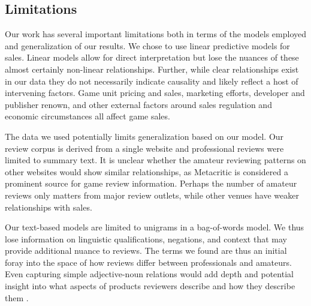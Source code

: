 \documentclass[letterpaper]{article}
\begin{document}

\subsection{Limitations}
Our work has several important limitations both in terms of the models
employed and generalization of our results. We chose to use linear
predictive models for sales. Linear models allow for direct
interpretation but lose the nuances of these almost certainly non-linear
relationships. Further, while clear relationships exist in our data they
do not necessarily indicate causality and likely reflect a host of
intervening factors. Game unit pricing and sales, marketing efforts,
developer and publisher renown, and other external factors around sales
regulation and economic circumstances all affect game sales. 

The data we used potentially limits generalization based on our model.
Our review corpus is derived from a single website and professional
reviews were limited to summary text. It is unclear whether the amateur
reviewing patterns on other websites would show similar relationships, as Metacritic is considered a prominent source for game review information. Perhaps the number of amateur reviews only matters from major review outlets, while other venues have weaker relationships with sales.

Our text-based models are limited to unigrams in a bag-of-words model.
We thus lose information on linguistic qualifications, negations, and
context that may provide additional nuance to reviews. The terms we
found are thus an initial foray into the space of how reviews differ
between professionals and amateurs. Even capturing simple adjective-noun
relations would add depth and potential insight into what aspects of
products reviewers describe and how they describe them \cite{zagal2011natural}.
\end{document}
